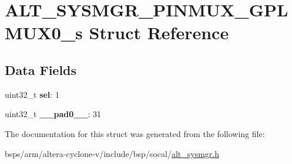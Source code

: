 \hypertarget{structALT__SYSMGR__PINMUX__GPLMUX0__s}{}\section{A\+L\+T\+\_\+\+S\+Y\+S\+M\+G\+R\+\_\+\+P\+I\+N\+M\+U\+X\+\_\+\+G\+P\+L\+M\+U\+X0\+\_\+s Struct Reference}
\label{structALT__SYSMGR__PINMUX__GPLMUX0__s}
\subsection*{Data Fields}
\begin{DoxyCompactItemize}
\item 
\mbox{\label{structALT__SYSMGR__PINMUX__GPLMUX0__s_a46836832f6f8560fa21df55952fc94c8}} 
uint32\+\_\+t {\bfseries sel}\+: 1
\item 
\mbox{\label{structALT__SYSMGR__PINMUX__GPLMUX0__s_ad1256ac982fb88f4867fa4e2160e9708}} 
uint32\+\_\+t {\bfseries \+\_\+\+\_\+pad0\+\_\+\+\_\+}\+: 31
\end{DoxyCompactItemize}


The documentation for this struct was generated from the following file\+:\begin{DoxyCompactItemize}
\item 
bsps/arm/altera-\/cyclone-\/v/include/bsp/socal/\mbox{\hyperlink{alt__sysmgr_8h}{alt\+\_\+sysmgr.\+h}}\end{DoxyCompactItemize}
